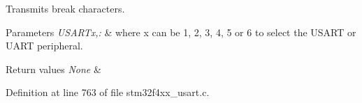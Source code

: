 Transmits break characters. 


\begin{DoxyParams}{Parameters}
{\em U\-S\-A\-R\-Tx,\-:} & where x can be 1, 2, 3, 4, 5 or 6 to select the U\-S\-A\-R\-T or U\-A\-R\-T peripheral. \\
\hline
\end{DoxyParams}

\begin{DoxyRetVals}{Return values}
{\em None} & \\
\hline
\end{DoxyRetVals}


Definition at line 763 of file stm32f4xx\-\_\-usart.\-c.

